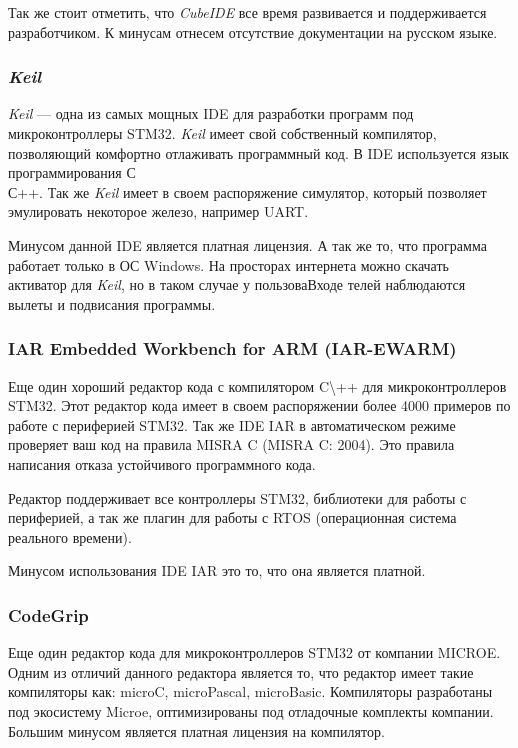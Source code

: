 Так же стоит отметить, что \textit{CubeIDE} все время развивается и поддерживается разработчиком. К минусам отнесем отсутствие документации на русском языке.

\subsubsection{\textit{Keil}}
\textit{Keil} — одна из самых мощных IDE для разработки программ под микроконтроллеры STM32. \textit{Keil} имеет свой собственный компилятор, позволяющий комфортно отлаживать программный код. В IDE используется язык программирования С\\С++. Так же \textit{Keil} имеет в своем распоряжение симулятор, который позволяет эмулировать некоторое железо, например UART.

Минусом данной IDE является платная лицензия. А так же то, что программа работает только в ОС Windows. На просторах интернета можно скачать активатор для \textit{Keil}, но в таком случае у пользоваВходе телей наблюдаются вылеты и подвисания программы.

\subsubsection{IAR Embedded Workbench for ARM (IAR-EWARM)}
Еще один хороший редактор кода с компилятором C\textbackslash++ для микроконтроллеров STM32. Этот редактор кода имеет в своем распоряжении более 4000 примеров по работе с периферией STM32. Так же IDE IAR в автоматическом режиме проверяет ваш код на правила MISRA C (MISRA C: 2004). Это правила написания отказа устойчивого программного кода.

Редактор поддерживает все контроллеры STM32, библиотеки для работы с периферией, а так же плагин для работы с RTOS (операционная система реального времени).

Минусом использования IDE IAR это то, что она является платной.

\subsubsection{CodeGrip}
Еще один редактор кода для микроконтроллеров STM32 от компании MICROE. Одним из отличий данного редактора является то, что редактор имеет такие компиляторы как: microC, microPascal, microBasic. Компиляторы разработаны под экосистему Microe, оптимизированы под отладочные комплекты компании. Большим минусом является платная лицензия на компилятор.

